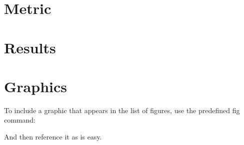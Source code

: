 
\label{chap:5_results}

\section{Metric}
\label{sec:5_metric}
\section{Results}
\label{sec:5_results}

\section{Graphics}

To include a graphic that appears in the list of figures, use the predefined fig command:\\

And then reference it as  is easy.